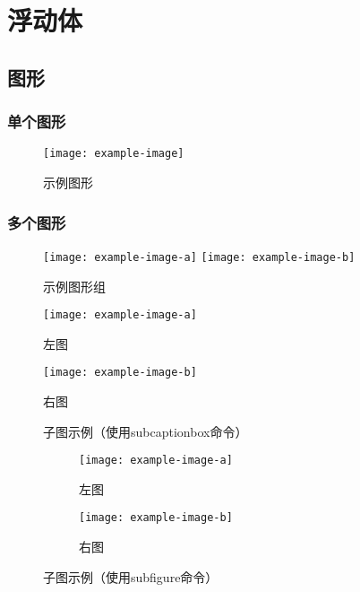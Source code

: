 \section{浮动体}\label{sec:float}

\subsection{图形}

\subsubsection{单个图形}

\begin{figure}[htbp]
    \centering
    \texttt{[image: example-image]}
    \caption{示例图形}
\end{figure}

\subsubsection{多个图形}

\begin{figure}[!htp]
    \centering
    \texttt{[image: example-image-a]}
    \hspace{1cm}
    \texttt{[image: example-image-b]}
    \caption{示例图形组}
\end{figure}

\begin{figure}[!htp]
    \begin{minipage}{0.4\textwidth}
        \centering
        \texttt{[image: example-image-a]}
        \caption{左图}
    \end{minipage}\hfill
    \begin{minipage}{0.4\textwidth}
        \centering
        \texttt{[image: example-image-b]}
        \caption{右图}
    \end{minipage}
\end{figure}

\begin{figure}[!htp]
    \centering
    \hspace{1cm}
    \caption{子图示例（使用subcaptionbox命令）}
\end{figure}

\begin{figure}[!htp]
    \centering
    \begin{subfigure}{0.3\textwidth}
        \centering
        \texttt{[image: example-image-a]}
        \caption{左图}
    \end{subfigure}
    \hspace{1cm}
    \begin{subfigure}{0.4\textwidth}
        \centering
        \texttt{[image: example-image-b]}
        \caption{右图}
    \end{subfigure}
    \caption{子图示例（使用subfigure命令）}
\end{figure}

